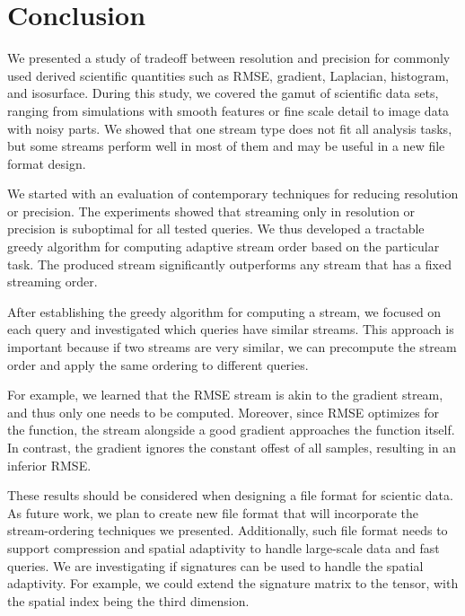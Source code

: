 \section{Conclusion}
We presented a study of tradeoff between resolution and precision for commonly used derived
scientific quantities such as RMSE, gradient, Laplacian, histogram, and isosurface.
During this study, we covered the gamut of scientific data sets, ranging from simulations
with smooth features or fine scale detail to image data with noisy parts.
We showed that one stream type does not fit all analysis tasks, but some streams perform well
in most of them and may be useful in a new file format design.





We started with an evaluation of contemporary techniques for reducing resolution or precision.
The experiments showed that streaming only in resolution or precision is suboptimal for all
tested queries. We thus developed a tractable greedy algorithm for computing adaptive stream order
based on the particular task. The produced stream significantly outperforms any stream that has
a fixed streaming order.

After establishing the greedy algorithm for computing a stream, we focused on each query and
investigated which queries have similar streams. This approach is important because if two streams
are very similar, we can precompute the stream order and apply the same ordering to different
queries.

For example, we learned that the RMSE stream is akin to the gradient stream, and thus only one
needs to be computed. Moreover, since RMSE optimizes for the function, the stream alongside
a good gradient approaches the function itself. In contrast, the gradient ignores the constant offest
of all samples, resulting in an inferior RMSE.


These results should be considered when designing a file format for scientic data. As future work,
we plan to create new file format that will incorporate the stream-ordering techniques we presented.
Additionally, such file format needs to support compression and spatial adaptivity to handle large-scale
data and fast queries. We are investigating if signatures can be used to handle
the spatial adaptivity. For example, we could extend the signature matrix to the tensor, with
the spatial index being the third dimension.
